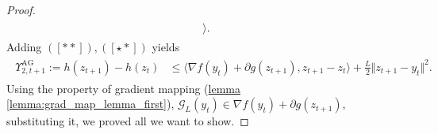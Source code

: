 \documentclass[12pt]{article}
\begin{document}
\begin{proof}
\begin{align*}
\begin{aligned}
                    \rangle. 
                \end{aligned}
                \tag{$[\star *]$}    
            \end{align*}
            Adding $([**]), ([\star *])$ yields 
            \begin{align*}
                \begin{aligned}
                    \Upsilon_{2, t + 1}^{\text{AG}} := 
                    h(z_{t + 1}) - h(z_t) 
                    &\le 
                    \langle 
                        \nabla f(y_t) + \partial g(z_{t+1}), 
                        z_{t + 1} - z_t
                    \rangle + 
                    \frac{L}{2}
                    \Vert 
                        z_{t + 1} - y_t
                    \Vert^2. 
                \end{aligned}
            \end{align*}
            Using the property of gradient mapping (\hyperref[lemma:grad_map_lemma_first]
                {lemma \ref*{lemma:grad_map_lemma_first}}), 
            $\mathcal G_L(y_t) \in \nabla f(y_t) + \partial g(z_{t + 1})$, substituting it, we proved all we want to show. 
        \end{proof}
\end{document}
